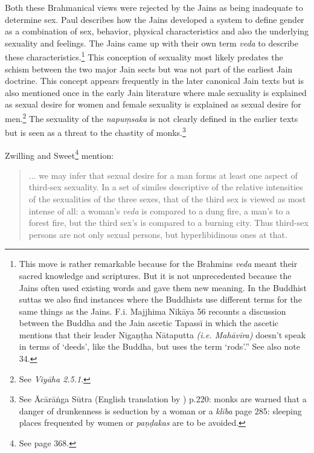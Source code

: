 Both these Brahmanical views were rejected by the Jains as being inadequate to determine sex. Paul \cite{dundas} describes how the Jains developed a system to define gender as a combination of sex, behavior, physical characteristics and also the underlying sexuality and feelings. The Jains came up with their own term {\em veda} to describe these characteristics.\footnote{This move is rather remarkable because for the Brahmins {\em veda} meant their sacred knowledge and scriptures. But it is not unprecedented because the Jains often used existing words and gave them new meaning. In the Buddhist suttas we also find instances where the Buddhists use different terms for the same things as the Jains. F.i. Majjhima Nikāya 56 recounts a discussion between the Buddha and the Jain ascetic Tapassī in which the ascetic mentions that their leader Nigaṇṭha Nātaputta {\em (i.e. Mahāvīra)} doesn’t speak in terms of ‘deeds’, like the Buddha, but uses the term ‘rods’.” See also \cite{zwilling} note 34.} This conception of sexuality most likely predates the schism between the two major Jain sects but was not part of the earliest Jain doctrine. This concept appears frequently in the later canonical Jain texts but is also mentioned once in the early Jain literature where male sexuality is explained as sexual desire for women and female sexuality is explained as sexual desire for men.\footnote{See {\em Viyāha 2.5.1}.} The sexuality of the {\em napuṃsaka} is not clearly defined in the earlier texts but is seen as a threat to the chastity of monks.\footnote{See Ācārāṅga Sūtra (English translation by \cite{jacobi}) p.220: monks are warned that a danger of drunkenness is seduction by a woman or a {\em klība} page 285: sleeping places frequented by women or {\em paṇḍakas} are to be avoided.}

Zwilling and Sweet\footnote{See \cite{zwilling} page 368.} mention:

\begin{quote}
... we may infer that sexual desire for a man forms at least one aspect of third-sex sexuality. In a set of similes descriptive of the relative intensities of the sexualities of the three sexes, that of the third sex is viewed as most intense of all: a woman's {\em veda} is compared to a dung fire, a man's to a forest fire, but the third sex's is compared to a burning city. Thus third-sex persons are not only sexual persons, but hyperlibidinous ones at that.
\end{quote}


